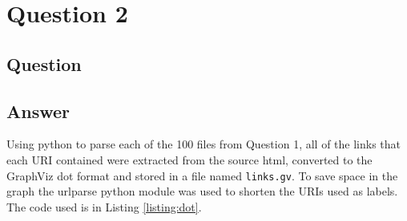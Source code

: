 \section{Question 2}

\subsection{Question}


\subsection{Answer}
Using python to parse each of the 100 files from Question 1, all of the links that each URI contained were extracted from the source html, converted to the GraphViz\cite{dot:graphviz} dot format and stored in a file named {\tt links.gv}. To save space in the graph the urlparse\cite{py:urlparse} python module was used to shorten the URIs used as labels. The code used is in Listing \ref{listing:dot}.

\newpage
